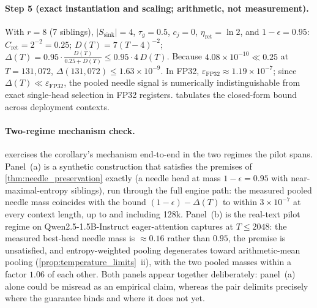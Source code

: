 \documentclass[final,5p,times,twocolumn]{elsarticle}
\theoremstyle{definition}
\theoremstyle{remark}
\newcommand{\Ssink}{S_{\mathrm{sink}}}
\begin{document}
\paragraph{Step 5 (exact instantiation and scaling; arithmetic, not
 measurement).}
With $r=8$ (7 siblings), $|\Ssink|=4$, $\tau_g=0.5$, $c_j=0$,
 $\eta_{\mathrm{ret}}=\ln 2$, and $1-\epsilon=0.95$:
 $C_{\mathrm{ret}} = 2^{-2} = 0.25$;
 $D(T) = 7(T-4)^{-2}$;
 $\Delta(T) = 0.95\cdot\frac{D(T)}{0.25+D(T)} \le 0.95\cdot 4\,D(T)$.
Because $4.08\times 10^{-10} \ll 0.25$ at $T = 131{,}072$,
 $\Delta(131{,}072) \le 1.63\times 10^{-9}$. In FP32,
 $\varepsilon_{\mathrm{FP32}} \approx 1.19\times 10^{-7}$; since
 $\Delta(T) \ll \varepsilon_{\mathrm{FP32}}$, the pooled needle signal
is numerically indistinguishable from exact single-head selection in
FP32 registers.  tabulates the closed-form
bound across deployment contexts.

\paragraph{Two-regime mechanism check.}
 exercises the corollary's mechanism end-to-end in the
two regimes the pilot spans. Panel~(a) is a synthetic construction
that satisfies the premises of \cref{thm:needle_preservation} exactly
(a needle head at mass $1-\epsilon = 0.95$ with near-maximal-entropy
siblings), run through the full engine path: the measured pooled
needle mass coincides with the bound $(1-\epsilon)-\Delta(T)$ to
within $3\times 10^{-7}$ at every context length, up to and including
128k. Panel~(b) is the real-text pilot regime on
Qwen2.5-1.5B-Instruct eager-attention captures at $T \le 2048$: the
measured best-head needle mass is $\approx 0.16$ rather than $0.95$,
the premise is unsatisfied, and entropy-weighted pooling degenerates
toward arithmetic-mean pooling
(\cref{prop:temperature_limits}~ii), with the two pooled masses within
a factor $1.06$ of each other. Both panels appear together
deliberately: panel~(a) alone could be misread as an empirical claim,
whereas the pair delimits precisely where the guarantee binds and
where it does not yet.
\end{document}

